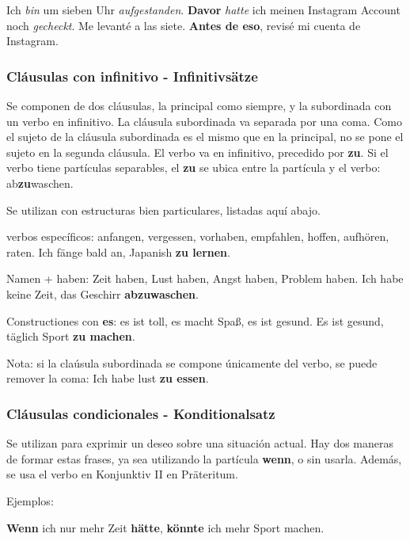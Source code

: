 Ich \textit{bin} um sieben Uhr \textit{aufgestanden}. \textbf{Davor} \textit{hatte} ich meinen Instagram Account noch \textit{gecheckt}. Me levanté a las siete. \textbf{Antes de eso}, revisé mi cuenta de Instagram.



\subsubsection{Cláusulas con infinitivo - Infinitivsätze}
Se componen de dos cláusulas, la principal como siempre, y la subordinada con un verbo en infinitivo. La cláusula subordinada va separada por una coma. Como el sujeto de la cláusula subordinada es el mismo que en la principal, no se pone el sujeto en la segunda cláusula. El verbo va en infinitivo, precedido por \textbf{zu}. Si el verbo tiene partículas separables, el \textbf{zu} se ubica entre la partícula y el verbo: ab\textbf{zu}waschen.


Se utilizan con estructuras bien particulares, listadas aquí abajo.

\begin{myitemize}
\item verbos específicos: anfangen, vergessen, vorhaben, empfahlen, hoffen, aufhören, raten. Ich fänge bald an, Japanish \textbf{zu lernen}.
\item Namen + haben: Zeit haben, Lust haben, Angst haben, Problem haben. Ich habe keine Zeit, das Geschirr \textbf{abzuwaschen}.
\item Constructiones con \textbf{es}: es ist toll, es macht Spaß, es ist gesund. Es ist gesund, täglich Sport \textbf{zu machen}.
\end{myitemize}

Nota: si la claúsula subordinada se compone únicamente del verbo, se puede remover la coma: Ich habe lust \textbf{zu essen}.

\subsubsection{Cláusulas condicionales - Konditionalsatz}
Se utilizan para exprimir un deseo sobre una situación actual. Hay dos maneras de formar estas frases, ya sea utilizando la partícula \textbf{wenn}, o sin usarla. Además, se usa el verbo en Konjunktiv II en Präteritum.

Ejemplos:

\textbf{Wenn} ich nur mehr Zeit \textbf{hätte}, \textbf{könnte} ich mehr Sport machen.

